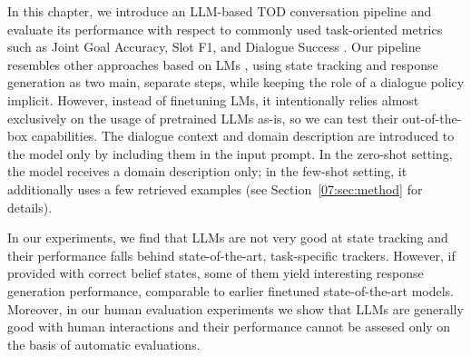 In this chapter, we introduce an LLM-based TOD conversation pipeline and evaluate its performance with respect to commonly used task-oriented metrics such as Joint Goal Accuracy, Slot F1, and Dialogue Success \cite{rastogi_multi-task_2018,budzianowski_multiwoz_2018}.
Our pipeline resembles other approaches based on LMs \cite{peng-etal-2021-soloist,yang2021ubar}, using state tracking and response generation as two main, separate steps, while keeping the role of a dialogue policy implicit.
However, instead of finetuning LMs, it intentionally relies almost exclusively on the usage of pretrained LLMs as-is, so we can test their out-of-the-box capabilities.
The dialogue context and domain description are introduced to the model only by including them in the input prompt.
In the zero-shot setting, the model receives a domain description only; in the few-shot setting, it additionally uses a few retrieved examples (see Section~\ref{07:sec:method} for details).

In our experiments, we find that LLMs are not very good at state tracking and their performance falls behind state-of-the-art, task-specific trackers.
However, if provided with correct belief states, some of them yield interesting response generation performance, comparable to earlier finetuned state-of-the-art models.
Moreover, in our human evaluation experiments we show that LLMs are generally good with human interactions and their performance cannot be assesed only on the basis of automatic evaluations.

